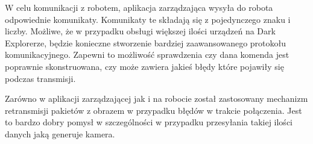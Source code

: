 W celu komunikacji z robotem, aplikacja zarządzająca wysyła do robota odpowiednie
komunikaty. Komunikaty te składają się z pojedynczego znaku i liczby. Możliwe, że
w przypadku obsługi większej ilości urządzeń na Dark Explorerze, będzie konieczne
stworzenie bardziej zaawansowanego protokołu komunikacyjnego. Zapewni to
możliwość sprawdzenia czy dana komenda jest poprawnie skonstruowana, czy może
zawiera jakieś błędy które pojawiły się podczas transmisji.

Zarówno w aplikacji zarządzającej jak i na robocie został zastosowany mechanizm
retransmisji pakietów z obrazem w przypadku błędów w trakcie połączenia. Jest to
bardzo dobry pomysł w szczególności w przypadku przesyłania takiej ilości danych
jaką generuje kamera.
